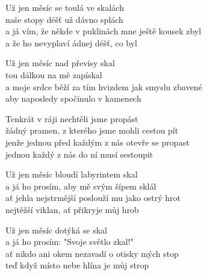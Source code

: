 
\ve
Už jen měsíc se toulá ve skalách\\
naše stopy  déšť už dávno splách\\
a já  vím, že někde v puklinách mne ještě kousek zbyl\\
a že ho nevyplaví ádnej déšť, co byl

\ve
Už jen měsíc nad převisy skal\\
tou dálkou na mě zapískal\\
a moje srdce běží za tím hvizdem jak smyslu zbavené\\
aby naposledy spočinulo v kamenech

\cho{}
Tenkrát v ráji nechtěli jsme propást\\
žádný pramen, z kterého jsme mohli cestou pít\\
jenže jednou před každým z nás otevře se propast\\
jednou každý z nás do ní musí sestoupit

\ve
Už jen měsíc bloudí labyrintem skal\\
a já ho prosím, aby mě svým šípem sklál\\
ať jehla nejstrmější poslouží mu jako ostrý hrot\\
nejtěžší viklan, ať přikryje můj hrob

\cho{}

\ve{}
Už jen měsíc dotýká se skal\\
a já ho prosím: "Svoje světlo zkal!"\\
ať nikdo ani okem nezavadí o otisky mých stop\\
teď když místo nebe hlína je můj strop

\esong